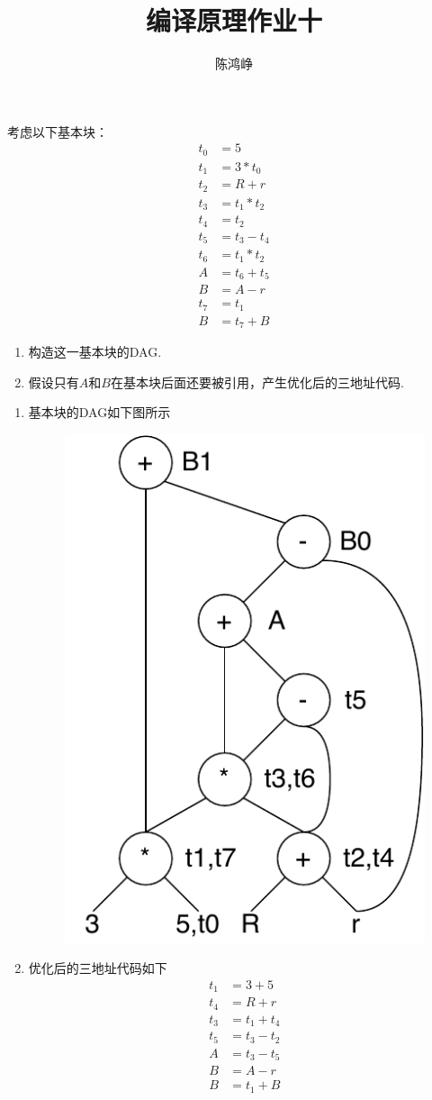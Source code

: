 \documentclass[logo,reportComp]{thesis}
\title{编译原理作业十}
\subtitle{}
\author{陈鸿峥}
\begin{document}
\maketitle

\begin{question}
考虑以下基本块：
\[\begin{aligned}
t_0 &= 5\\
t_1 &= 3 * t_0\\
t_2 &= R + r\\
t_3 &= t_1 * t_2\\
t_4 &= t_2\\
t_5 &= t_3 - t_4\\
t_6 &= t_1 * t_2\\
A   &= t_6 + t_5\\
B   &= A - r\\
t_7 &= t_1\\
B   &= t_7 + B
\end{aligned}\]
\begin{enumerate}
\item 构造这一基本块的DAG.
\item 假设只有$A$和$B$在基本块后面还要被引用，产生优化后的三地址代码.
\end{enumerate}
\end{question}
\begin{answer}
\begin{enumerate}
	\item 基本块的DAG如下图所示
	\begin{figure}[H]
	\centering
	\includegraphics[width=0.4\linewidth]{fig/dag-1.pdf}
	\end{figure}
	\item 优化后的三地址代码如下
\[\begin{aligned}
t_1 &= 3 + 5\\
t_4 &= R + r\\
t_3 &= t_1 + t_4\\
t_5 &= t_3 - t_2\\
A &= t_3 - t_5\\
B &= A - r\\
B &= t_1 + B
\end{aligned}\]
\end{enumerate}
\end{answer}
\end{document}

